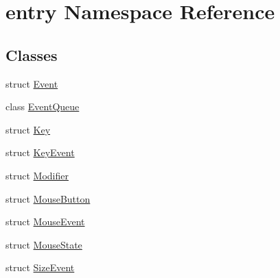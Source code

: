 \hypertarget{namespaceentry}{\section{entry Namespace Reference}
\label{namespaceentry}
}
\subsection*{Classes}
\begin{DoxyCompactItemize}
\item 
struct \hyperlink{structentry_1_1_event}{Event}
\item 
class \hyperlink{classentry_1_1_event_queue}{Event\+Queue}
\item 
struct \hyperlink{structentry_1_1_key}{Key}
\item 
struct \hyperlink{structentry_1_1_key_event}{Key\+Event}
\item 
struct \hyperlink{structentry_1_1_modifier}{Modifier}
\item 
struct \hyperlink{structentry_1_1_mouse_button}{Mouse\+Button}
\item 
struct \hyperlink{structentry_1_1_mouse_event}{Mouse\+Event}
\item 
struct \hyperlink{structentry_1_1_mouse_state}{Mouse\+State}
\item 
struct \hyperlink{structentry_1_1_size_event}{Size\+Event}
\end{DoxyCompactItemize}
